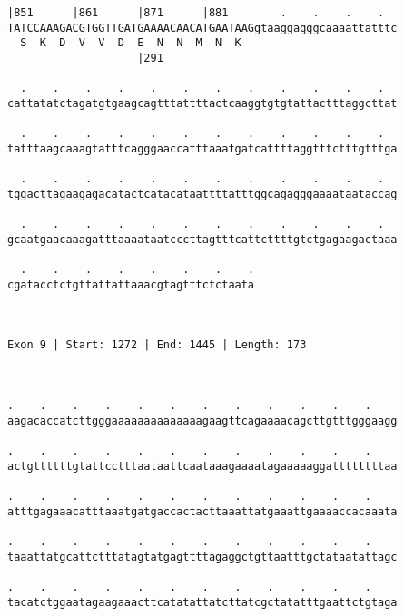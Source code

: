 \documentclass{article}
\begin{document}
\begin{Verbatim}
|851      |861      |871      |881        .    .    .    .  
TATCCAAAGACGTGGTTGATGAAAACAACATGAATAAGgtaaggagggcaaaattatttc
  S  K  D  V  V  D  E  N  N  M  N  K                        
                    |291                                    
  
  .    .    .    .    .    .    .    .    .    .    .    .  
cattatatctagatgtgaagcagtttattttactcaaggtgtgtattactttaggcttat
                                                            
  .    .    .    .    .    .    .    .    .    .    .    .  
tatttaagcaaagtatttcagggaaccatttaaatgatcattttaggtttctttgtttga
                                                            
  .    .    .    .    .    .    .    .    .    .    .    .  
tggacttagaagagacatactcatacataattttatttggcagagggaaaataataccag
                                                            
  .    .    .    .    .    .    .    .    .    .    .    .  
gcaatgaacaaagatttaaaataatcccttagtttcattcttttgtctgagaagactaaa
                                                            
  .    .    .    .    .    .    .    .
cgatacctctgttattattaaacgtagtttctctaata
                                      
                                      
 
Exon 9 | Start: 1272 | End: 1445 | Length: 173



.    .    .    .    .    .    .    .    .    .    .    .    
aagacaccatcttgggaaaaaaaaaaaaaagaagttcagaaaacagcttgtttgggaagg
                                                            
.    .    .    .    .    .    .    .    .    .    .    .    
actgttttttgtattcctttaataattcaataaagaaaatagaaaaaggattttttttaa
                                                            
.    .    .    .    .    .    .    .    .    .    .    .    
atttgagaaacatttaaatgatgaccactacttaaattatgaaattgaaaaccacaaata
                                                            
.    .    .    .    .    .    .    .    .    .    .    .    
taaattatgcattctttatagtatgagttttagaggctgttaatttgctataatattagc
                                                            
.    .    .    .    .    .    .    .    .    .    .    .    
tacatctggaatagaagaaacttcatatattatcttatcgctatatttgaattctgtaga
                                                            

\end{Verbatim}
\end{document}
